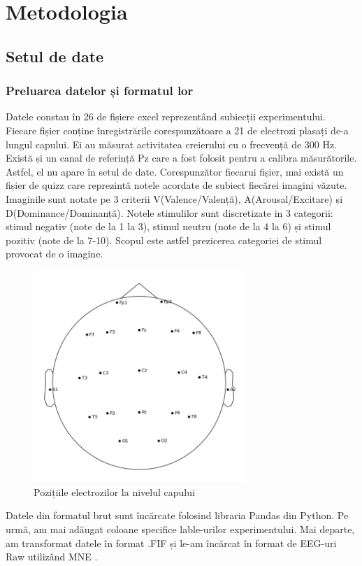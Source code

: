 
\def\totalEpoci{0}
\def\totalEpociTestare{0}
\def\totalEpociValentaPozitiva{0}
\def\totalEpociValentaNegativa{0}
\def\totalEpociValentaNeutra{0}
\def\crestereAcurateteAutoReject{0}
\def\nrParticipantiAntrenare{0}
\def\nrParticipantiValidare{0}
\def\nrParticipantiTestare{0}

\usepackage{float}

\chapter{Metodologia}

\section{Setul de date}
\subsection{Preluarea datelor și formatul lor}
Datele constau în 26 de fișiere excel reprezentând subiecții experimentului. Fiecare fișier conține înregistrările corespunzătoare a 21 de electrozi plasați de-a lungul capului. Ei au măsurat activitatea creierului cu o frecvență de 300 Hz. Există și un canal de referință Pz care a fost folosit pentru a calibra măsurătorile. Astfel, el nu apare în setul de date. Corespunzător fiecarui fișier, mai există un fișier de quizz care reprezintă notele acordate de subiect fiecărei imagini văzute. Imaginile sunt notate pe 3 criterii V(Valence/Valență), A(Arousal/Excitare) și D(Dominance/Dominanță). Notele stimulilor sunt discretizate in 3 categorii: stimul negativ (note de la 1 la 3), stimul neutru (note de la 4 la 6) și stimul pozitiv (note de la 7-10). Scopul este astfel prezicerea categoriei de stimul provocat de o imagine.
\setlength{\abovecaptionskip}{0pt}
\setlength{\belowcaptionskip}{0pt}
\clearpage
\begin{figure}[h]
    \centering
    \includegraphics[width=8cm]{images/Sensor_positions_(eeg).png}
    \caption{Pozițiile electrozilor la nivelul capului}
    \label{fig:sensor_positions}
\end{figure}
Datele din formatul brut sunt încărcate folosind libraria Pandas \cite{reback2020pandas} din Python. Pe urmă, am mai adăugat coloane specifice lable-urilor experimentului. Mai departe, am transformat datele în format .FIF și le-am încărcat în format de EEG-uri Raw utilizând MNE \cite{MNE}.

